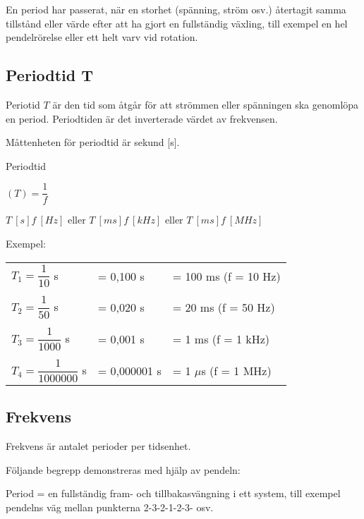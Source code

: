En period har passerat, när en storhet (spänning, ström osv.) återtagit samma
tillstånd eller värde efter att ha gjort en fullständig växling, till exempel en hel
pendelrörelse eller ett helt varv vid rotation.

\subsection{Periodtid T}

Periotid \(T\) är den tid som åtgår för att strömmen eller spänningen ska
genomlöpa en period. Periodtiden är det inverterade värdet av frekvensen.

Måttenheten för periodtid är sekund [s].

Periodtid

\((T) = \dfrac{1}{f}\)

\(T\ [s]  f\ [Hz]\) eller
\(T\ [ms] f\ [kHz]\) eller
\(T\ [ms] f\ [MHz]\)

Exempel:
\begin{table*}
\begin{center}
\begin{tabular}{lll}
\(T_1=\dfrac{1}{10}\) s & = 0,100 s & = 100 ms (f = 10 Hz)\\
\\
\(T_2=\dfrac{1}{50}\) s & = 0,020 s & = 20 ms (f = 50 Hz)\\
\\
\(T_3=\dfrac{1}{1000}\) s & = 0,001 s & = 1 ms (f = 1 kHz)\\
\\
\(T_4=\dfrac{1}{1000000}\) s & = 0,000001 s & = 1 \(\mu\)s (f = 1 MHz)\\
\end{tabular}
\end{center}
\end{table*}

\subsection{Frekvens}

Frekvens är antalet perioder per tidsenhet.

Följande begrepp demonstreras med hjälp av pendeln:

Period = en fullständig fram- och tillbakasvängning i ett system, till exempel
pendelns väg mellan punkterna 2-3-2-1-2-3- osv.


